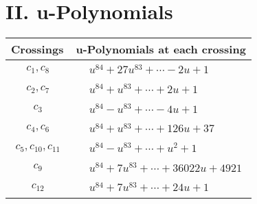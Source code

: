 \documentclass[1p]{elsarticle_modified}
\theoremstyle{definition}
\begin{document}
\newpage\renewcommand{\arraystretch}{1}
\centering \section*{ II. u-Polynomials}
\begin{tabular}{m{50pt}|m{274pt}}
Crossings & \hspace{64pt}u-Polynomials at each crossing \\
\hline $$\begin{aligned}c_{1},c_{8}\end{aligned}$$&$\begin{aligned}
&u^{84}+27 u^{83}+\cdots-2 u+1
\end{aligned}$\\
\hline $$\begin{aligned}c_{2},c_{7}\end{aligned}$$&$\begin{aligned}
&u^{84}+u^{83}+\cdots+2 u+1
\end{aligned}$\\
\hline $$\begin{aligned}c_{3}\end{aligned}$$&$\begin{aligned}
&u^{84}- u^{83}+\cdots-4 u+1
\end{aligned}$\\
\hline $$\begin{aligned}c_{4},c_{6}\end{aligned}$$&$\begin{aligned}
&u^{84}+u^{83}+\cdots+126 u+37
\end{aligned}$\\
\hline $$\begin{aligned}c_{5},c_{10},c_{11}\end{aligned}$$&$\begin{aligned}
&u^{84}- u^{83}+\cdots+u^2+1
\end{aligned}$\\
\hline $$\begin{aligned}c_{9}\end{aligned}$$&$\begin{aligned}
&u^{84}+7 u^{83}+\cdots+36022 u+4921
\end{aligned}$\\
\hline $$\begin{aligned}c_{12}\end{aligned}$$&$\begin{aligned}
&u^{84}+7 u^{83}+\cdots+24 u+1
\end{aligned}$\\
\hline
\end{tabular}\newpage\renewcommand{\arraystretch}{1}
\end{document}
